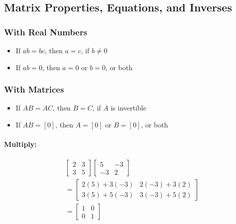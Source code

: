 \documentclass[
  letterpaper,
  DIV=11,
  numbers=noendperiod]{scrartcl}
\let\oldparagraph\paragraph
\renewcommand{\paragraph}[1]{\oldparagraph{#1}\mbox{}}
\providecommand{\tightlist}{%
  \setlength{\itemsep}{0pt}\setlength{\parskip}{0pt}}\usepackage{longtable,booktabs,array}
\begin{document}
\hypertarget{matrix-properties-equations-and-inverses}{%
\subsection{Matrix Properties, Equations, and
Inverses}\label{matrix-properties-equations-and-inverses}}

\hypertarget{with-real-numbers}{%
\subsubsection{With Real Numbers}\label{with-real-numbers}}

\begin{itemize}
\tightlist
\item
  If \(ab = bc\), then \(a = c\), if \(b \ne 0\)
\item
  If \(ab = 0\), then \(a = 0\) or \(b = 0\), or both
\end{itemize}

\hypertarget{with-matrices}{%
\subsubsection{With Matrices}\label{with-matrices}}

\begin{itemize}
\tightlist
\item
  If \(AB = AC\), then \(B = C\), if \(A\) is invertible
\item
  If \(AB = [0]\), then \(A = [0]\) or \(B = [0]\), or both
\end{itemize}

\hypertarget{multiply}{%
\paragraph{Multiply:}\label{multiply}}

\begin{align*}
&\begin{bmatrix} 2 & 3 \\ 3 & 5 \end{bmatrix}
\begin{bmatrix} 5 & -3 \\ -3 & 2 \end{bmatrix} \\
&= \begin{bmatrix} 2(5)+3(-3) & 2(-3)+3(2) \\ 3(5)+5(-3) & 3(-3)+5(2) \end{bmatrix} \\
&= \begin{bmatrix} 1 & 0 \\ 0 & 1 \end{bmatrix}
\end{align*}
\end{document}
